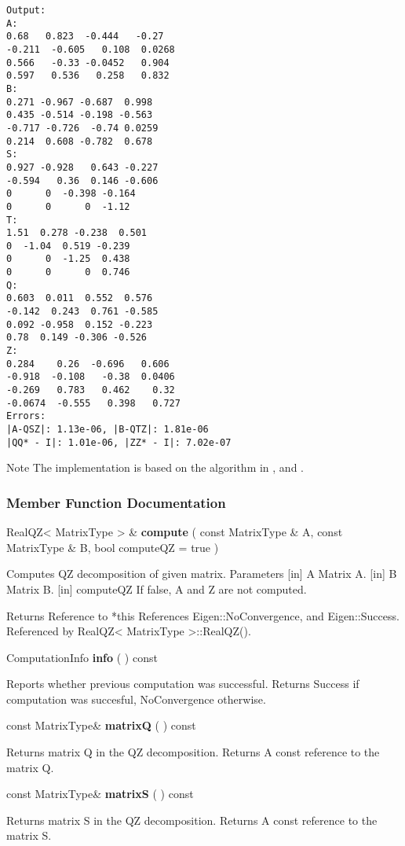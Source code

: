 \begin{verbatim}
Output:
A:   
0.68   0.823  -0.444   -0.27 
-0.211  -0.605   0.108  0.0268  
0.566   -0.33 -0.0452   0.904  
0.597   0.536   0.258   0.832
B: 
0.271 -0.967 -0.687  0.998 
0.435 -0.514 -0.198 -0.563
-0.717 -0.726  -0.74 0.0259 
0.214  0.608 -0.782  0.678
S: 
0.927 -0.928   0.643 -0.227
-0.594   0.36  0.146 -0.606
0      0  -0.398 -0.164
0      0      0  -1.12
T:
1.51  0.278 -0.238  0.501
0  -1.04  0.519 -0.239
0      0  -1.25  0.438
0      0      0  0.746
Q:
0.603  0.011  0.552  0.576
-0.142  0.243  0.761 -0.585
0.092 -0.958  0.152 -0.223
0.78  0.149 -0.306 -0.526
Z:
0.284    0.26  -0.696   0.606
-0.918  -0.108   -0.38  0.0406
-0.269   0.783   0.462    0.32
-0.0674  -0.555   0.398   0.727
Errors:
|A-QSZ|: 1.13e-06, |B-QTZ|: 1.81e-06
|QQ* - I|: 1.01e-06, |ZZ* - I|: 7.02e-07
\end{verbatim}


Note
The implementation is based on the algorithm in  \cite{Golub1996}, and \cite{Moler_1973}.


\subsubsection{Member Function Documentation}

RealQZ< MatrixType > \& \textbf{compute}  ( const MatrixType \&  A,    const MatrixType \&  B,    bool  computeQZ = true   )   

Computes QZ decomposition of given matrix. 
Parameters
[in] A Matrix A.  
[in] B Matrix B.  
[in] computeQZ If false, A and Z are not computed.  

Returns Reference to *this 
References Eigen::NoConvergence, and Eigen::Success.
Referenced by RealQZ< MatrixType >::RealQZ().


\vspace{0.3cm}
ComputationInfo \textbf{info}  ( )  const 

Reports whether previous computation was successful. 
Returns Success if computation was succesful, NoConvergence otherwise. 

\vspace{0.3cm}
const MatrixType\& \textbf{matrixQ}  ( )  const 

Returns matrix Q in the QZ decomposition. 
Returns
A const reference to the matrix Q. 


\vspace{0.3cm}
const MatrixType\& \textbf{matrixS}  ( )  const 

Returns matrix S in the QZ decomposition. 
Returns
A const reference to the matrix S. 


